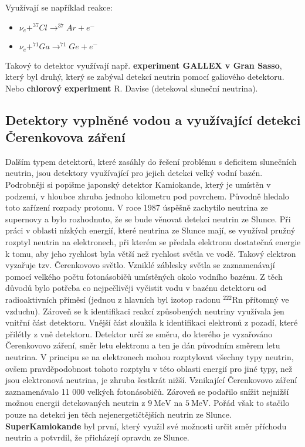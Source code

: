 \documentclass[../../main.tex]{subfiles}
\begin{document}
Využívají se například reakce:
\begin{itemize}
	\item $\nu _e + ^{37}Cl \rightarrow ^{37}Ar + e^-$
	\item $\nu_e + ^{71}Ga \rightarrow ^{71}Ge + e^-$
\end{itemize}

Takový to detektor využívají např. \textbf{experiment GALLEX v Gran Sasso}, který byl druhý, který se zabýval detekcí neutrin pomocí galiového detektoru. Nebo \textbf{chlorový experiment} R. Davise (detekoval sluneční neutrina).

\subsection{Detektory vyplněné vodou a využívající detekci Čerenkovova záření}

Dalším typem detektorů, které zasáhly do řešení problému s deficitem slunečních neutrin, jsou detektory využívající pro jejich detekci velký vodní bazén. Podrobněji si popišme japonský detektor Kamiokande, který je umístěn v podzemí, v hloubce zhruba jednoho kilometru pod povrchem. Původně hledalo toto zařízení rozpady protonu. V roce 1987 úspěšně zachytilo neutrina ze supernovy a bylo rozhodnuto, že se bude věnovat detekci neutrin ze Slunce. Při práci v oblasti nízkých energií, které neutrina ze Slunce mají, se využíval pružný rozptyl neutrin na elektronech, při kterém se předala elektronu dostatečná energie k tomu, aby jeho rychlost byla větší než rychlost světla ve vodě. Takový elektron vyzařuje tzv. Čerenkovovo světlo. Vzniklé záblesky světla se zaznamenávají pomocí velkého počtu fotonásobičů umístěných okolo vodního bazénu. Z těch důvodů bylo potřeba co nejpečlivěji vyčistit vodu v bazénu detektoru od radioaktivních příměsí (jednou z hlavních byl izotop radonu $^{222}$Rn přítomný ve vzduchu). Zároveň se k identifikaci reakcí způsobených neutriny využívala jen vnitřní část detektoru. Vnější část sloužila k identifikaci elektronů z pozadí, které přilétly z vně detektoru. Detektor určí ze směru, do kterého je vyzařováno Čerenkovovo záření, směr letu elektronu a ten je dán původním směrem letu neutrina. V principu se na elektronech mohou rozptylovat všechny typy neutrin, ovšem pravděpodobnost tohoto rozptylu v této oblasti energií pro jiné typy, než jsou elektronová neutrina, je zhruba šestkrát nižší. Vznikající Čerenkovovo záření zaznamenávalo 11 000 velkých fotonásobičů. Zároveň se podařilo snížit nejnižší možnou energii detekovaných neutrin z $9 ~\mathrm{MeV}$ na $5 ~\mathrm{MeV}$. Pořád však to stačilo pouze na detekci jen těch nejenergetičtějších neutrin ze Slunce. \textbf{SuperKamiokande} byl první, který využil své možnosti určit směr příchodu neutrin a potvrdil, že přicházejí opravdu ze Slunce.
\end{document}
